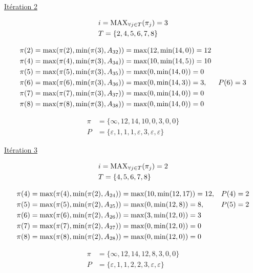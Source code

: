 \documentclass{article}
\begin{document}
\underline{Itération 2}

\begin{align*}
  &i = \operatorname{MAX}_{\forall j \in T}(\pi_j) = 3\\
  &T = \{2,4,5,6,7,8\}
\end{align*}

\begin{align*}
  &\pi(2) = \operatorname{max}(\pi(2), \operatorname{min}(\pi(3), A_{32})) = \operatorname{max}(12, \operatorname{min}(14,0)) = 12\\
  &\pi(4) = \operatorname{max}(\pi(4), \operatorname{min}(\pi(3), A_{34})) = \operatorname{max}(10, \operatorname{min}(14,5)) = 10\\
  &\pi(5) = \operatorname{max}(\pi(5), \operatorname{min}(\pi(3), A_{35})) = \operatorname{max}(0, \operatorname{min}(14,0)) = 0\\
  &\pi(6) = \operatorname{max}(\pi(6), \operatorname{min}(\pi(3), A_{36})) = \operatorname{max}(0, \operatorname{min}(14,3)) = 3, &P(6) = 3\\
  &\pi(7) = \operatorname{max}(\pi(7), \operatorname{min}(\pi(3), A_{37})) = \operatorname{max}(0, \operatorname{min}(14,0)) = 0\\
  &\pi(8) = \operatorname{max}(\pi(8), \operatorname{min}(\pi(3), A_{38})) = \operatorname{max}(0, \operatorname{min}(14,0)) = 0
\end{align*}

\begin{align*}
  \pi &= \{\infty,12,14,10,0,3,0,0\}\\
  P &= \{\varepsilon, 1, 1, 1, \varepsilon, 3, \varepsilon, \varepsilon\}
\end{align*}

\underline{Itération 3}

\begin{align*}
  &i = \operatorname{MAX}_{\forall j \in T}(\pi_j) = 2\\
  &T = \{4,5,6,7,8\}
\end{align*}

\begin{align*}
  &\pi(4) = \operatorname{max}(\pi(4), \operatorname{min}(\pi(2), A_{24})) = \operatorname{max}(10, \operatorname{min}(12,17)) = 12, &P(4) = 2\\
  &\pi(5) = \operatorname{max}(\pi(5), \operatorname{min}(\pi(2), A_{25})) = \operatorname{max}(0, \operatorname{min}(12,8)) = 8, &P(5) = 2\\
  &\pi(6) = \operatorname{max}(\pi(6), \operatorname{min}(\pi(2), A_{26})) = \operatorname{max}(3, \operatorname{min}(12,0)) = 3\\
  &\pi(7) = \operatorname{max}(\pi(7), \operatorname{min}(\pi(2), A_{27})) = \operatorname{max}(0, \operatorname{min}(12,0)) = 0\\
  &\pi(8) = \operatorname{max}(\pi(8), \operatorname{min}(\pi(2), A_{28})) = \operatorname{max}(0, \operatorname{min}(12,0)) = 0
\end{align*}

\begin{align*}
  \pi &= \{\infty,12,14,12,8,3,0,0\}\\
  P &= \{\varepsilon, 1, 1, 2, 2, 3, \varepsilon, \varepsilon\}
\end{align*}
\end{document}
